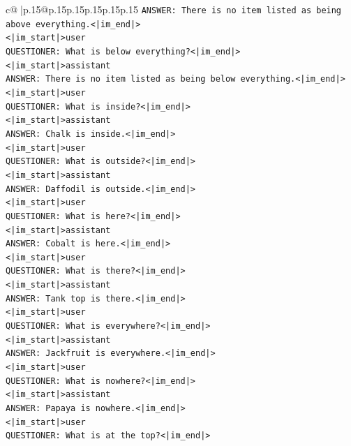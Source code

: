 \documentclass{article}
\begin{document}
{\begin{supertabular}{c@{$\;$}|p{.15\linewidth}@{}p{.15\linewidth}p{.15\linewidth}p{.15\linewidth}p{.15\linewidth}p{.15\linewidth}}
{{{\texttt{ANSWER: There is no item listed as being above everything.<|im\_end|>} \\
\texttt{<|im\_start|>user} \\
\texttt{QUESTIONER: What is below everything?<|im\_end|>} \\
\texttt{<|im\_start|>assistant} \\
\texttt{ANSWER: There is no item listed as being below everything.<|im\_end|>} \\
\texttt{<|im\_start|>user} \\
\texttt{QUESTIONER: What is inside?<|im\_end|>} \\
\texttt{<|im\_start|>assistant} \\
\texttt{ANSWER: Chalk is inside.<|im\_end|>} \\
\texttt{<|im\_start|>user} \\
\texttt{QUESTIONER: What is outside?<|im\_end|>} \\
\texttt{<|im\_start|>assistant} \\
\texttt{ANSWER: Daffodil is outside.<|im\_end|>} \\
\texttt{<|im\_start|>user} \\
\texttt{QUESTIONER: What is here?<|im\_end|>} \\
\texttt{<|im\_start|>assistant} \\
\texttt{ANSWER: Cobalt is here.<|im\_end|>} \\
\texttt{<|im\_start|>user} \\
\texttt{QUESTIONER: What is there?<|im\_end|>} \\
\texttt{<|im\_start|>assistant} \\
\texttt{ANSWER: Tank top is there.<|im\_end|>} \\
\texttt{<|im\_start|>user} \\
\texttt{QUESTIONER: What is everywhere?<|im\_end|>} \\
\texttt{<|im\_start|>assistant} \\
\texttt{ANSWER: Jackfruit is everywhere.<|im\_end|>} \\
\texttt{<|im\_start|>user} \\
\texttt{QUESTIONER: What is nowhere?<|im\_end|>} \\
\texttt{<|im\_start|>assistant} \\
\texttt{ANSWER: Papaya is nowhere.<|im\_end|>} \\
\texttt{<|im\_start|>user} \\
\texttt{QUESTIONER: What is at the top?<|im\_end|>} \\
}}}
\end{supertabular}}
\end{document}
